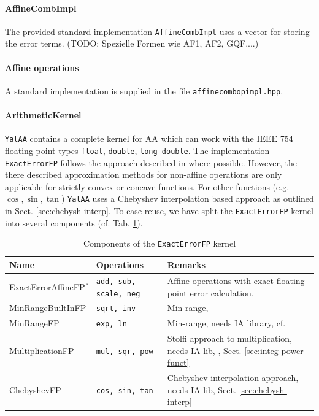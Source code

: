 \documentclass[a4]{scrartcl}
\newcommand{\yalaa}{\texttt{YalAA}\xspace}
\begin{document}
\paragraph{AffineCombImpl}
The provided standard implementation \texttt{AffineCombImpl} uses a vector for
storing the error terms. (TODO: Spezielle Formen wie AF1, AF2, GQF,...)

\paragraph{Affine operations}
A standard implementation is supplied
in the file \texttt{affinecombopimpl.hpp}.

\paragraph{ArithmeticKernel}
\yalaa contains a complete kernel for AA which can work with the IEEE 754
floating-point types \texttt{float}, \texttt{double}, \texttt{long double}.
The implementation \texttt{ExactErrorFP} follows the approach described in
\cite{stolfi1997} where possible. However, the there described approximation
methods for non-affine operations are only applicable for strictly convex or
concave functions. For other functions (e.g. $\cos, \sin, \tan$) \yalaa uses a
Chebyshev interpolation based approach as outlined in
Sect. \ref{sec:chebysh-interp}. To ease reuse, we have split the
\texttt{ExactErrorFP} kernel into several components
(cf. Tab. \ref{tab:comp_arith_kernel}).
\begin{table}[h]
  \centering
  \begin{tabular}{lp{}p{}}
    \hline
    Name & Operations & Remarks\\
    \hline
    ExactErrorAffineFPf & \texttt{add, sub, scale, neg} & Affine operations with exact
    floating-point error calculation, \cite{stolfi1997}\\
    MinRangeBuiltInFP & \texttt{sqrt, inv} & Min-range, \cite{stolfi1997}\\
    MinRangeFP & \texttt{exp, ln} & Min-range, needs IA library, cf. \cite{stolfi1997}\\
    MultiplicationFP & \texttt{mul, sqr, pow} & Stolfi approach to
    multiplication, needs IA lib, \cite{stolfi1997}, Sect. \ref{sec:integ-power-funct}\\
    ChebyshevFP & \texttt{cos, sin, tan} & Chebyshev interpolation approach,
    needs IA lib, Sect. \ref{sec:chebysh-interp}\\
    \hline
  \end{tabular}
  \caption{Components of the \texttt{ExactErrorFP} kernel}
  \label{tab:comp_arith_kernel}
\end{table}
\end{document}
